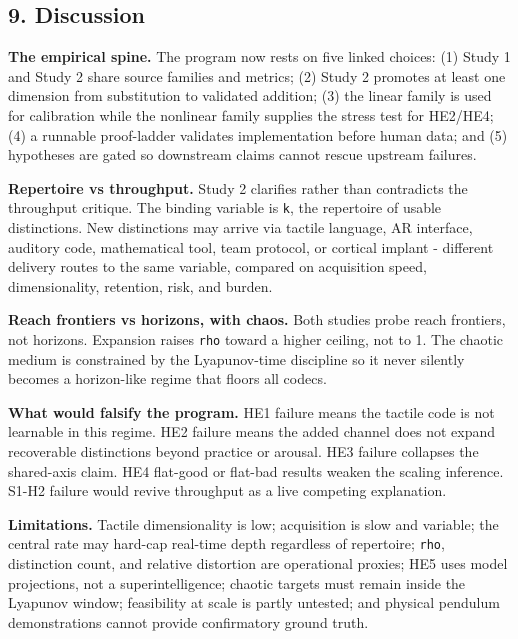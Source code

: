 \documentclass[
  11pt,
]{article}
\begin{document}
\subsection{9. Discussion}\label{discussion}

\textbf{The empirical spine.} The program now
rests on five linked choices: (1) Study 1 and
Study 2 share source families and metrics; (2)
Study 2 promotes at least one dimension from
substitution to validated addition; (3) the
linear family is used for calibration while the
nonlinear family supplies the stress test for
HE2/HE4; (4) a runnable proof-ladder validates
implementation before human data; and (5)
hypotheses are gated so downstream claims cannot
rescue upstream failures.

\textbf{Repertoire vs throughput.} Study 2
clarifies rather than contradicts the throughput
critique. The binding variable is \texttt{k},
the repertoire of usable distinctions. New
distinctions may arrive via tactile language, AR
interface, auditory code, mathematical tool,
team protocol, or cortical implant - different
delivery routes to the same variable, compared
on acquisition speed, dimensionality, retention,
risk, and burden.

\textbf{Reach frontiers vs horizons, with
chaos.} Both studies probe reach frontiers, not
horizons. Expansion raises \texttt{rho} toward a
higher ceiling, not to 1. The chaotic medium is
constrained by the Lyapunov-time discipline so
it never silently becomes a horizon-like regime
that floors all codecs.

\textbf{What would falsify the program.} HE1
failure means the tactile code is not learnable
in this regime. HE2 failure means the added
channel does not expand recoverable distinctions
beyond practice or arousal. HE3 failure
collapses the shared-axis claim. HE4 flat-good
or flat-bad results weaken the scaling
inference. S1-H2 failure would revive throughput
as a live competing explanation.

\textbf{Limitations.} Tactile dimensionality is
low; acquisition is slow and variable; the
central rate may hard-cap real-time depth
regardless of repertoire; \texttt{rho},
distinction count, and relative distortion are
operational proxies; HE5 uses model projections,
not a superintelligence; chaotic targets must
remain inside the Lyapunov window; feasibility
at scale is partly untested; and physical
pendulum demonstrations cannot provide
confirmatory ground truth.
\end{document}
